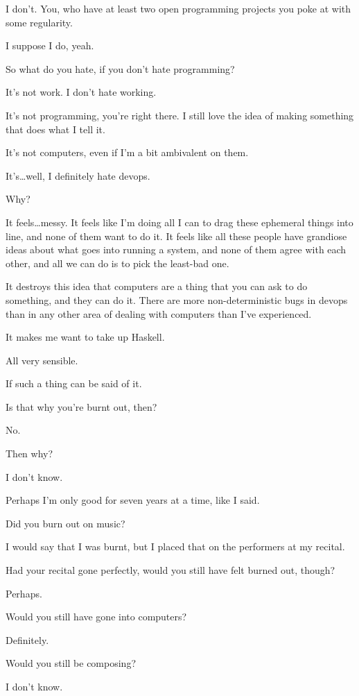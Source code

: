 \begin{ally}
I don't. You, who have at least two open programming projects you poke at with some regularity.
\end{ally}
I suppose I do, yeah.

\begin{ally}
So what do you hate, if you don't hate programming?
\end{ally}
It's not work. I don't hate working.

It's not programming, you're right there. I still love the idea of making something that does what I tell it.

It's not computers, even if I'm a bit ambivalent on them.

It's\ldots{}well, I definitely hate devops.

\begin{ally}
Why?
\end{ally}
It feels\ldots{}messy. It feels like I'm doing all I can to drag these ephemeral things into line, and none of them want to do it. It feels like all these people have grandiose ideas about what goes into running a system, and none of them agree with each other, and all we can do is to pick the least-bad one.

It destroys this idea that computers are a thing that you can ask to do something, and they can do it. There are more non-deterministic bugs in devops than in any other area of dealing with computers than I've experienced.

It makes me want to take up Haskell.

\begin{ally}
All very sensible.
\end{ally}
If such a thing can be said of it.

\begin{ally}
Is that why you're burnt out, then?
\end{ally}
No.

\begin{ally}
Then why?
\end{ally}
I don't know.

Perhaps I'm only good for seven years at a time, like I said.

\begin{ally}
Did you burn out on music?
\end{ally}
I would say that I was burnt, but I placed that on the performers at my recital.

\begin{ally}
Had your recital gone perfectly, would you still have felt burned out, though?
\end{ally}
Perhaps.

\begin{ally}
Would you still have gone into computers?
\end{ally}
Definitely.

\begin{ally}
Would you still be composing?
\end{ally}
I don't know.
